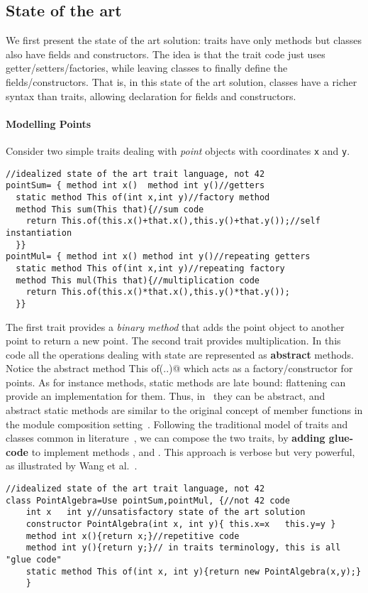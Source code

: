 \subsection{State of the art}
We first present the state of the art solution: 
traits have only methods but classes also have fields and constructors.
The idea is that the trait code just uses getter/setters/factories, while leaving
classes to finally define the fields/constructors. That
is, in this state of the art solution, classes have a richer syntax than traits, allowing
declaration for fields and constructors. 

\paragraph{Modelling Points} Consider two simple 
traits dealing with \emph{point} objects with coordinates \lstinline{x} and
\lstinline{y}.
\saveSpace\saveSpace
\begin{lstlisting}
//idealized state of the art trait language, not 42
pointSum= { method int x()  method int y()//getters
  static method This of(int x,int y)//factory method
  method This sum(This that){//sum code
    return This.of(this.x()+that.x(),this.y()+that.y());//self instantiation
  }}
pointMul= { method int x() method int y()//repeating getters
  static method This of(int x,int y)//repeating factory
  method This mul(This that){//multiplication code
    return This.of(this.x()*that.x(),this.y()*that.y());
  }}
\end{lstlisting}
\saveSpace\saveSpace
The first trait provides a \emph{binary method} that 
adds the point object to another point to return a new point. 
The second trait provides multiplication.
\noindent In this code all the operations dealing with state are represented as {\bf abstract} methods.
Notice the abstract \Q@static method This of(..)@ which acts as a factory/constructor
for points. 
As for instance methods, static methods are late bound:  flattening can provide an implementation for them.
Thus, in \name\ they can be abstract, and abstract static methods are similar to the original concept of member functions in the module composition setting~\cite{ancona2002calculus}.
Following the traditional model of traits and classes common in literature~\cite{ducasse2006traits},
we can compose the two traits, by \textbf{adding glue-code}
to implement methods \Q@x@, \Q@y@ and \Q@of@.
This approach is verbose but very
powerful, as illustrated by Wang et al.~\cite{wang2016classless}.
\saveSpace\saveSpace
\begin{lstlisting}
//idealized state of the art trait language, not 42
class PointAlgebra=Use pointSum,pointMul, {//not 42 code
    int x   int y//unsatisfactory state of the art solution
    constructor PointAlgebra(int x, int y){ this.x=x   this.y=y }
    method int x(){return x;}//repetitive code
    method int y(){return y;}// in traits terminology, this is all "glue code"
    static method This of(int x, int y){return new PointAlgebra(x,y);}
    }
\end{lstlisting}
\saveSpace\saveSpace

